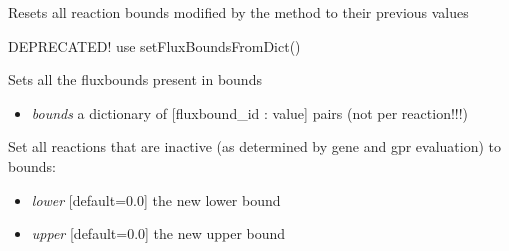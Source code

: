 \documentclass[a4paper,11pt,english]{sphinxmanual}
\begin{document}
\begin{fulllineitems}
\begin{fulllineitems}
\begin{itemize}
\end{itemize}

\end{fulllineitems}


\begin{fulllineitems}
\label{modules_doc:cbmpy.CBModel.Model.resetAllInactiveGPRBounds}
Resets all reaction bounds modified by the  method to their previous values

\end{fulllineitems}


\begin{fulllineitems}
\label{modules_doc:cbmpy.CBModel.Model.setAllFluxBounds}
DEPRECATED! use setFluxBoundsFromDict()

Sets all the fluxbounds present in bounds
\begin{itemize}
\item {} 
\emph{bounds} a dictionary of {[}fluxbound\_id : value{]} pairs (not per reaction!!!)

\end{itemize}

\end{fulllineitems}


\begin{fulllineitems}
\label{modules_doc:cbmpy.CBModel.Model.setAllInactiveGPRBounds}
Set all reactions that are inactive (as determined by gene and gpr evaluation) to bounds:
\begin{itemize}
\item {} 
\emph{lower} {[}default=0.0{]} the new lower bound

\item {} 
\emph{upper} {[}default=0.0{]} the new upper bound

\end{itemize}

\end{fulllineitems}



\end{fulllineitems}
\end{document}
